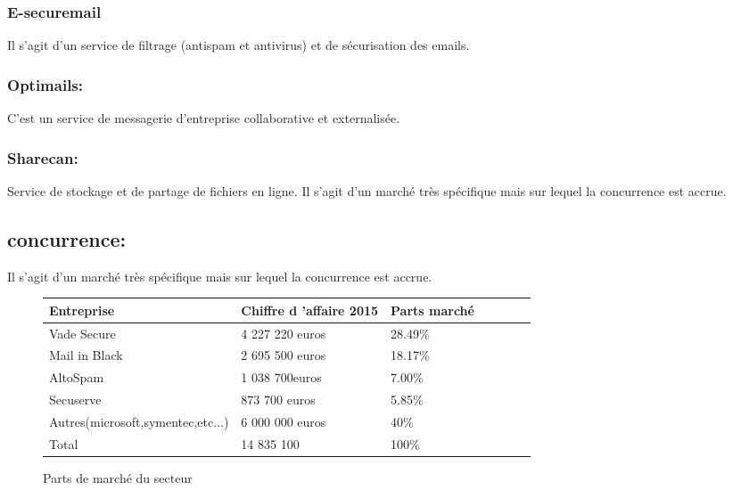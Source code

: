 \subsubsection{E-securemail}
Il s’agit d’un service de filtrage (antispam et antivirus) et de sécurisation des emails.
\subsubsection{Optimails:} C’est un service de messagerie d’entreprise collaborative et externalisée.
\subsubsection{Sharecan:}Service de stockage et de partage de fichiers en ligne.
Il s’agit d’un marché très spécifique mais sur lequel la concurrence est accrue.

\subsection{concurrence:}
Il s’agit d’un marché très spécifique mais sur lequel la concurrence est accrue.\\

\begin{figure}[!h]
\begin{center}
\begin{tabular}{|l|l|l|l|c|l|l|}
  \hline
 Entreprise & Chiffre d 'affaire 2015& Parts marché\\
  \hline
   Vade Secure& 4 227 220 euros & 28.49\% \\
   \hline
  Mail in Black& 2 695 500 euros & 18.17\% \\
  \hline
  AltoSpam& 1 038 700euros & 7.00\% \\
  \hline  
   \rowcolor{orange}Secuserve& 873 700 euros& 5.85\% \\
	\hline
   Autres(microsoft,symentec,etc...)& 6 000 000 euros & 40\%\\
	\hline  
    Total& 14 835 100 & 100\% \\
  \hline
\end{tabular}
\end{center}
\caption{Parts de marché du secteur}
\end{figure}

